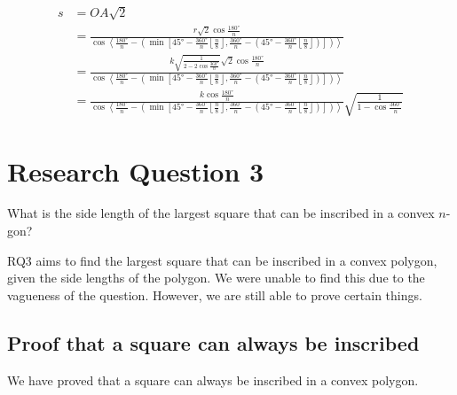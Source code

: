 \documentclass[12pt]{scrartcl}
\begin{document}
\begin{align*}
	s & = OA\sqrt{2}                                                                                                                                                                                                                                                                                                                                               \\
	  & = \frac{r \sqrt{2} \cos \frac{\ang{180}}{n}}{\cos \left\langle\frac{\ang{180}}{n} - \left(\min\left[\ang{45} - \frac{\ang{360}}{n}\left\lfloor \frac{n}{8} \right\rfloor, \frac{\ang{360}}{n} - \left(\ang{45} - \frac{\ang{360}}{n}\left\lfloor \frac{n}{8}\right\rfloor\right)\right]\right)\right\rangle}                                               \\
	  & = \frac{k\sqrt{\frac{1}{2 - 2\cos\frac{\ang{360}}{n}}} \sqrt{2} \cos \frac{\ang{180}}{n}}{\cos \left\langle\frac{\ang{180}}{n} - \left(\min\left[\ang{45} - \frac{\ang{360}}{n}\left\lfloor \frac{n}{8} \right\rfloor, \frac{\ang{360}}{n} - \left(\ang{45} - \frac{\ang{360}}{n}\left\lfloor \frac{n}{8} \right\rfloor\right)\right]\right)\right\rangle} \\
	  & = \frac{k \cos \frac{\ang{180}}{n}}{\cos \left\langle\frac{\ang{180}}{n} - \left(\min\left[\ang{45} - \frac{\ang{360}}{n}\left\lfloor \frac{n}{8} \right\rfloor, \frac{\ang{360}}{n} - \left(\ang{45} - \frac{\ang{360}}{n}\left\lfloor \frac{n}{8} \right\rfloor\right)\right]\right)\right\rangle} \sqrt{\frac{1}{1 - \cos\frac{\ang{360}}{n}}}
\end{align*}

\section{Research Question 3}
What is the side length of the largest square that can be inscribed in a convex $n$-gon?

RQ3 aims to find the largest square that can be inscribed in a convex polygon, given the side lengths of the polygon.
We were unable to find this due to the vagueness of the question. However, we are still able to prove certain things.

\subsection{Proof that a square can always be inscribed}
We have proved that a square can always be inscribed in a convex polygon.
\end{document}
